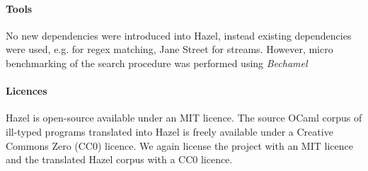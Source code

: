 \paragraph{Tools} No new dependencies were introduced into Hazel, instead existing dependencies were used, e.g.  \cite{JSOO} for regex matching, Jane Street  \cite{Base} for streams. However, micro benchmarking of the search procedure was performed using \textit{Bechamel} \cite{Bechamel}

\paragraph{Licences} Hazel is open-source available under an MIT licence. The source OCaml corpus of ill-typed programs \cite{OCamlCorpus} translated into Hazel is freely available under a Creative Commons Zero (CC0) licence. We again license the project with an MIT licence and the translated Hazel corpus with a CC0 licence.
